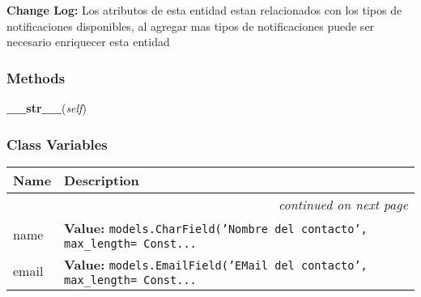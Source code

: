 \textbf{Change Log:} Los atributos de esta entidad estan relacionados con los tipos de 
notificaciones disponibles, al agregar mas tipos de notificaciones puede 
ser necesario enriquecer esta entidad





  \subsubsection{Methods}

    \label{GroundSegment:models:Notification:Contact:Contact:__str__}

    \vspace{0.5ex}

\hspace{.8\funcindent}\begin{boxedminipage}{\funcwidth}

    \raggedright \textbf{\_\_str\_\_}(\textit{self})

\setlength{\parskip}{2ex}
\setlength{\parskip}{1ex}
    \end{boxedminipage}



  \subsubsection{Class Variables}

    \vspace{-1cm}
\hspace{\varindent}\begin{longtable}{|p{\varnamewidth}|p{\vardescrwidth}|l}
\cline{1-2}
\cline{1-2} \centering \textbf{Name} & \centering \textbf{Description}& \\
\cline{1-2}
\endhead\cline{1-2}\multicolumn{3}{r}{\small\textit{continued on next page}}\\\endfoot\cline{1-2}
\endlastfoot\raggedright n\-a\-m\-e\- & \raggedright \textbf{Value:} 
{\tt models.CharField('Nombre del contacto', max\_length= Const\texttt{...}}&\\
\cline{1-2}
\raggedright e\-m\-a\-i\-l\- & \raggedright \textbf{Value:} 
{\tt models.EmailField('EMail del contacto', max\_length= Const\texttt{...}}&\\
\cline{1-2}
\end{longtable}

